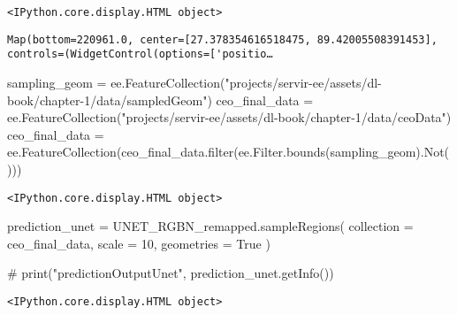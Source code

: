 \documentclass[
  letterpaper,
  DIV=11,
  numbers=noendperiod]{scrreprt}
\newenvironment{Shaded}{\begin{snugshade}}{\end{snugshade}}
\newcommand{\BuiltInTok}[1]{\textcolor[rgb]{0.00,0.23,0.31}{#1}}
\newcommand{\CommentTok}[1]{\textcolor[rgb]{0.37,0.37,0.37}{#1}}
\newcommand{\DecValTok}[1]{\textcolor[rgb]{0.68,0.00,0.00}{#1}}
\newcommand{\NormalTok}[1]{\textcolor[rgb]{0.00,0.23,0.31}{#1}}
\newcommand{\OperatorTok}[1]{\textcolor[rgb]{0.37,0.37,0.37}{#1}}
\newcommand{\StringTok}[1]{\textcolor[rgb]{0.13,0.47,0.30}{#1}}
\newcommand{\VariableTok}[1]{\textcolor[rgb]{0.07,0.07,0.07}{#1}}
\begin{document}
\begin{verbatim}
<IPython.core.display.HTML object>
\end{verbatim}

\begin{verbatim}
Map(bottom=220961.0, center=[27.378354616518475, 89.42005508391453], controls=(WidgetControl(options=['positio…
\end{verbatim}

\begin{Shaded}
\begin{Highlighting}[]
\NormalTok{sampling\_geom }\OperatorTok{=}\NormalTok{ ee.FeatureCollection(}\StringTok{"projects/servir{-}ee/assets/dl{-}book/chapter{-}1/data/sampledGeom"}\NormalTok{)}
\NormalTok{ceo\_final\_data }\OperatorTok{=}\NormalTok{ ee.FeatureCollection(}\StringTok{"projects/servir{-}ee/assets/dl{-}book/chapter{-}1/data/ceoData"}\NormalTok{)}
\NormalTok{ceo\_final\_data }\OperatorTok{=}\NormalTok{ ee.FeatureCollection(ceo\_final\_data.}\BuiltInTok{filter}\NormalTok{(ee.Filter.bounds(sampling\_geom).Not()))}
\end{Highlighting}
\end{Shaded}

\begin{verbatim}
<IPython.core.display.HTML object>
\end{verbatim}

\begin{Shaded}
\begin{Highlighting}[]
\NormalTok{prediction\_unet }\OperatorTok{=}\NormalTok{ UNET\_RGBN\_remapped.sampleRegions(}
\NormalTok{    collection }\OperatorTok{=}\NormalTok{ ceo\_final\_data,}
\NormalTok{    scale }\OperatorTok{=} \DecValTok{10}\NormalTok{,}
\NormalTok{    geometries }\OperatorTok{=} \VariableTok{True}
\NormalTok{)}

\CommentTok{\# print("predictionOutputUnet", prediction\_unet.getInfo())}
\end{Highlighting}
\end{Shaded}

\begin{verbatim}
<IPython.core.display.HTML object>
\end{verbatim}
\end{document}
